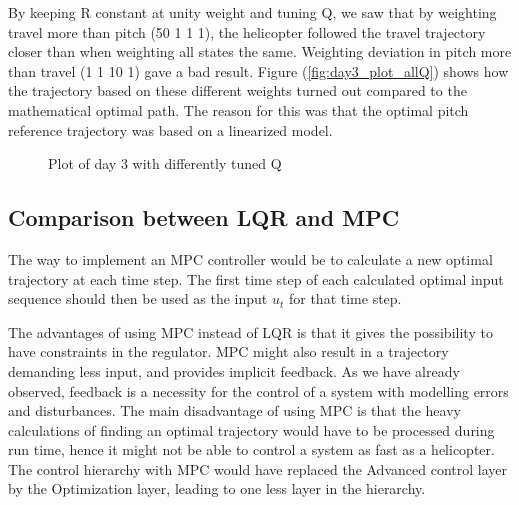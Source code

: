 By keeping R constant at unity weight and tuning Q, we saw that by weighting travel more than pitch (50 1 1 1), the helicopter followed the travel trajectory closer than when weighting all states the same. Weighting deviation in pitch more than travel (1 1 10 1) gave a bad result. Figure (\ref{fig:day3_plot_allQ}) shows how the trajectory based on these different weights turned out compared to the mathematical optimal path. The reason for this was that the optimal pitch reference trajectory was based on a linearized model.
\begin{figure}[htb]
	\centering
	\caption{Plot of day 3 with differently tuned Q}
	\label{fig:day3_allQ}
\end{figure}




\subsection{Comparison between LQR and MPC}
The way to implement an MPC controller would be to calculate a new optimal trajectory at each time step. The first time step of each calculated optimal input sequence should then be used as the input $u_t$ for that time step.

The advantages of using MPC instead of LQR is that it gives the possibility to have constraints in the regulator. MPC might also result in a trajectory demanding less input, and provides implicit feedback. As we have already observed, feedback is a necessity for the control of a system with modelling errors and disturbances. 
The main disadvantage of using MPC is that the heavy calculations of finding an optimal trajectory would have to be processed during run time, hence it might not be able to control a system as fast as a helicopter.
The control hierarchy with MPC would have replaced the Advanced control layer by the Optimization layer, leading to one less layer in the hierarchy.

